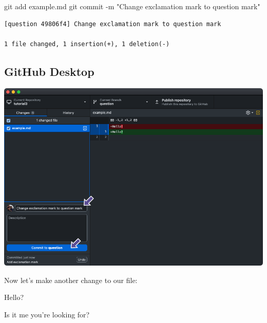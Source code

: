 \documentclass[
  letterpaper,
  DIV=11,
  numbers=noendperiod]{scrartcl}
\newenvironment{Shaded}{\begin{snugshade}}{\end{snugshade}}
\newcommand{\AttributeTok}[1]{\textcolor[rgb]{0.40,0.45,0.13}{#1}}
\newcommand{\FunctionTok}[1]{\textcolor[rgb]{0.28,0.35,0.67}{#1}}
\newcommand{\NormalTok}[1]{\textcolor[rgb]{0.00,0.23,0.31}{#1}}
\newcommand{\StringTok}[1]{\textcolor[rgb]{0.13,0.47,0.30}{#1}}
\begin{document}
\begin{Shaded}
\begin{Highlighting}[]
\FunctionTok{git}\NormalTok{ add example.md}
\FunctionTok{git}\NormalTok{ commit }\AttributeTok{{-}m} \StringTok{"Change exclamation mark to question mark"}
\end{Highlighting}
\end{Shaded}

\begin{verbatim}
[question 49806f4] Change exclamation mark to question mark

1 file changed, 1 insertion(+), 1 deletion(-)
\end{verbatim}

\subsection{GitHub Desktop}

\includegraphics{images/image38.png}

Now let's make another change to our file:

\begin{tcolorbox}[enhanced jigsaw, coltitle=black, colback=white, colbacktitle=quarto-callout-note-color!10!white, breakable, bottomrule=.15mm, colframe=quarto-callout-note-color-frame, left=2mm, toptitle=1mm, leftrule=.75mm, toprule=.15mm, title=\textcolor{quarto-callout-note-color}{\faInfo}\hspace{0.5em}{example.md}, titlerule=0mm, arc=.35mm, bottomtitle=1mm, rightrule=.15mm, opacitybacktitle=0.6, opacityback=0]

Hello?

Is it me you're looking for?

\end{tcolorbox}
\end{document}

